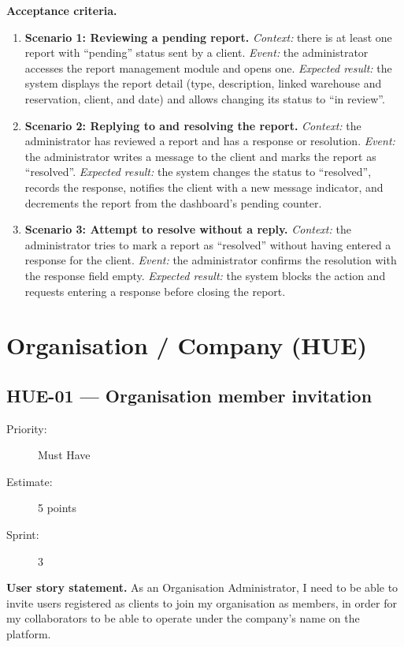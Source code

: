 \documentclass[11pt,a4paper,oneside]{report}
\begin{document}
\textbf{Acceptance criteria.}
\begin{enumerate}
\item \textbf{Scenario 1: Reviewing a pending report.} \emph{Context:} there is at least one report with ``pending'' status sent by a client. \emph{Event:} the administrator accesses the report management module and opens one. \emph{Expected result:} the system displays the report detail (type, description, linked warehouse and reservation, client, and date) and allows changing its status to ``in review''.
\item \textbf{Scenario 2: Replying to and resolving the report.} \emph{Context:} the administrator has reviewed a report and has a response or resolution. \emph{Event:} the administrator writes a message to the client and marks the report as ``resolved''. \emph{Expected result:} the system changes the status to ``resolved'', records the response, notifies the client with a new message indicator, and decrements the report from the dashboard's pending counter.
\item \textbf{Scenario 3: Attempt to resolve without a reply.} \emph{Context:} the administrator tries to mark a report as ``resolved'' without having entered a response for the client. \emph{Event:} the administrator confirms the resolution with the response field empty. \emph{Expected result:} the system blocks the action and requests entering a response before closing the report.
\end{enumerate}

\section{Organisation / Company (HUE)}

\subsection{HUE-01 --- Organisation member invitation}
\label{req:HUE-01}
\begin{description}
\item[Priority:] Must Have \quad \item[Estimate:] 5 points \quad \item[Sprint:] 3
\end{description}

\textbf{User story statement.} As an Organisation Administrator, I need to be able to invite users registered as clients to join my organisation as members, in order for my collaborators to be able to operate under the company's name on the platform.
\end{document}
